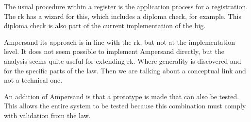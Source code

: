 {The usual procedure within a register is the application process for a registration. 
The \acrlong{rk} has a wizard for this, which includes a diploma check, for example. 
This diploma check is also part of the current implementation of the \acrshort{big}.}

{Ampersand its approach is in line with the \acrlong{rk}, but not at the implementation level. 
It does not seem possible to implement Ampersand directly, but the analysis seems quite useful for extending \acrlong{rk}. 
Where generality is discovered and for the specific parts of the law. 
Then we are talking about a conceptual link and not a technical one.}

{An addition of Ampersand is that a prototype is made that can also be tested. 
This allows the entire system to be tested because this combination must comply with validation from the law.}